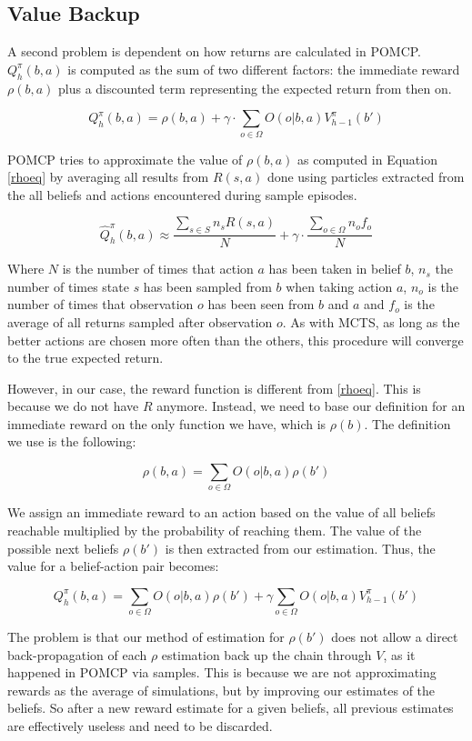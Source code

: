 \subsection{Value Backup}

A second problem is dependent on how returns are calculated in POMCP. $Q^\pi_h(b,a)$ is computed as the
sum of two different factors: the immediate reward $\rho(b,a)$ plus a discounted term representing
the expected return from then on.

\[ Q^\pi_h(b,a) = \rho(b,a) + \gamma \cdot \sum_{o\in \Omega} O(o|b,a) V^\pi_{h-1}(b') \]

POMCP tries to approximate the value of $\rho(b,a)$ as computed in Equation \ref{rhoeq} by averaging
all results from $R(s,a)$ done using particles extracted from the all beliefs and actions
encountered during sample episodes.

\[ \hat{Q}^\pi_h(b,a) \approx \frac{\sum_{s \in S} n_s R(s,a)}{N} + \gamma \cdot \frac{\sum_{o\in \Omega} n_o f_o}{N} \]

Where $N$ is the number of times that action $a$ has been taken in belief $b$, $n_s$ the number of
times state $s$ has been sampled from $b$ when taking action $a$, $n_o$ is the number of times that
observation $o$ has been seen from $b$ and $a$ and $f_o$ is the average of all returns sampled after
observation $o$. As with MCTS, as long as the better actions are chosen more often than the others,
this procedure will converge to the true expected return.

However, in our case, the reward function is different from \ref{rhoeq}. This is because we do not have $R$
anymore. Instead, we need to base our definition for an immediate reward on the only function we have, 
which is $\rho(b)$. The definition we use is the following:

\[ \rho(b,a) = \sum_{o\in \Omega} O(o | b, a) \rho(b') \]

We assign an immediate reward to an action based on the value of all beliefs reachable multiplied by the 
probability of reaching them. The value of the possible next beliefs $\rho(b')$ is then extracted from our estimation. Thus, 
the value for a belief-action pair becomes:

\[ Q^\pi_h(b,a) = \sum_{o\in \Omega} O(o | b,a) \rho(b') + \gamma\sum_{o\in\Omega} O(o|b,a) V^\pi_{h-1}(b') \]

The problem is that our method of estimation for $\rho(b')$ does not allow a direct back-propagation
of each $\rho$ estimation back up the chain through $V$, as it happened in POMCP via samples. This
is because we are not approximating rewards as the average of simulations, but by improving our
estimates of the beliefs. So after a new reward estimate for a given beliefs, all previous estimates
are effectively useless and need to be discarded.

